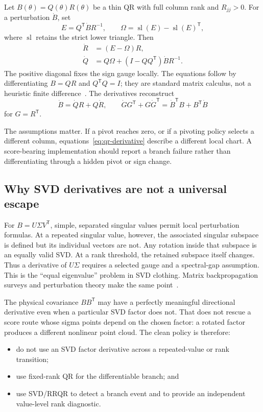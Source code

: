 \documentclass[11pt]{article}
\newcommand{\transpose}{^{\mathsf T}}
\begin{document}
Let $B(\theta)=Q(\theta)R(\theta)$ be a thin QR with full column rank and
$R_{jj}>0$.  For a perturbation $\dot B$, set
\begin{equation}
 E=Q\transpose\dot B R^{-1},
 \qquad \Omega=\operatorname{sl}(E)-\operatorname{sl}(E)\transpose,
 \label{eq:qr-derivative-def}
\end{equation}
where $\operatorname{sl}$ retains the strict lower triangle.  Then
\begin{align}
 \dot R&=(E-\Omega)R,\\
 \dot Q&=Q\Omega+(I-QQ\transpose)\dot B R^{-1}.
 \label{eq:qr-derivative}
\end{align}
The positive diagonal fixes the sign gauge locally.  The equations follow by
differentiating $B=QR$ and $Q\transpose Q=I$; they are standard matrix
calculus, not a heuristic finite difference~\cite{magnusneudecker1999,
stewartsun1990}.  The derivatives reconstruct
\begin{equation}
 \dot B=\dot Q R+Q\dot R,
 \qquad
 \dot G G\transpose+G\dot G\transpose=\dot B\transpose B+B\transpose\dot B
 \label{eq:qr-reconstruction}
\end{equation}
for $G=R\transpose$.

The assumptions matter.  If a pivot reaches zero, or if a pivoting policy
selects a different column, equations~\eqref{eq:qr-derivative} describe a
different local chart.  A score-bearing implementation should report a branch
failure rather than differentiating through a hidden pivot or sign change.

\subsection{Why SVD derivatives are not a universal escape}

For $B=U\Sigma V\transpose$, simple, separated singular values permit local
perturbation formulas.  At a repeated singular value, however, the associated
singular subspace is defined but its individual vectors are not.  Any rotation
inside that subspace is an equally valid SVD.  At a rank threshold, the retained
subspace itself changes.  Thus a derivative of $U\Sigma$ requires a selected
gauge and a spectral-gap assumption.  This is the ``equal eigenvalue'' problem
in SVD clothing.  Matrix backpropagation surveys and perturbation theory make
the same point~\cite{stewartsun1990,ionescu2015}.

The physical covariance $BB\transpose$ may have a perfectly meaningful
directional derivative even when a particular SVD factor does not.  That does
not rescue a score route whose sigma points depend on the chosen factor: a
rotated factor produces a different nonlinear point cloud.  The clean policy is
therefore:
\begin{itemize}
  \item do not use an SVD factor derivative across a repeated-value or rank
        transition;
  \item use fixed-rank QR for the differentiable branch; and
  \item use SVD/RRQR to detect a branch event and to provide an independent
        value-level rank diagnostic.
\end{itemize}
\end{document}
